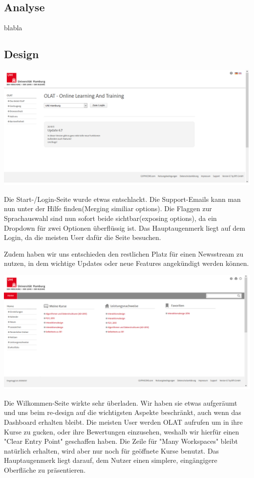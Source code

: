 \documentclass[a4paper,10pt]{article}
\begin{document}
\kopf
\renewcommand{\figurename}{Figure}


\subsection{Analyse}
blabla

\subsection{Design}
\includegraphics[scale=0.4]{images/login_seite.png}

Die Start-/Login-Seite wurde etwas entschlackt. Die Support-Emails kann man nun unter der Hilfe finden(Merging similiar options). Die Flaggen zur Sprachauswahl sind nun sofort beide sichtbar(exposing options), da ein Dropdown für zwei Optionen überflüssig ist. Das Hauptaugenmerk liegt auf dem Login, da die meisten User dafür die Seite besuchen.

Zudem haben wir uns entschieden den restlichen Platz für einen Newsstream zu nutzen, in dem wichtige Updates oder neue Features angekündigt werden können.


\includegraphics[scale=0.4]{images/wilkommen_seite.png}

Die Wilkommen-Seite wirkte sehr überladen. Wir haben sie etwas aufgeräumt und uns beim re-design auf die wichtigsten Aspekte beschränkt, auch wenn das Dashboard erhalten bleibt. Die meisten User werden OLAT aufrufen um in ihre Kurse zu gucken, oder ihre Bewertungen einzusehen, weshalb wir hierfür einen "Clear Entry Point" geschaffen haben. Die Zeile für "Many Workspaces" bleibt natürlich erhalten, wird aber nur noch für geöffnete Kurse benutzt. Das Hauptaugenmerk liegt darauf, dem Nutzer einen simplere, eingängigere Oberfläche zu präsentieren.
\end{document}
